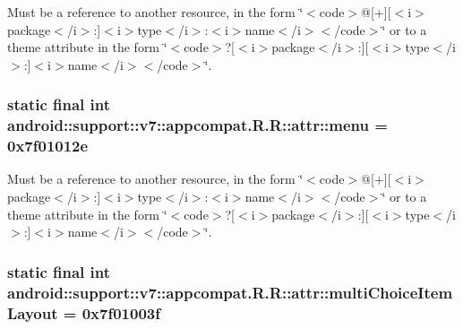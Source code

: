 Must be a reference to another resource, in the form \char`\"{}$<$code$>$@\mbox{[}+\mbox{]}\mbox{[}$<$i$>$package$<$/i$>$:\mbox{]}$<$i$>$type$<$/i$>$:$<$i$>$name$<$/i$>$$<$/code$>$\char`\"{} or to a theme attribute in the form \char`\"{}$<$code$>$?\mbox{[}$<$i$>$package$<$/i$>$:\mbox{]}\mbox{[}$<$i$>$type$<$/i$>$:\mbox{]}$<$i$>$name$<$/i$>$$<$/code$>$\char`\"{}. \hypertarget{classandroid_1_1support_1_1v7_1_1appcompat_1_1_r_1_1attr_8d30d60b10606828651e8c499f4fbe4e}{
\subsubsection[{menu}]{\setlength{\rightskip}{0pt plus 5cm}static final int android::support::v7::appcompat.R.R::attr::menu = 0x7f01012e}}
\label{classandroid_1_1support_1_1v7_1_1appcompat_1_1_r_1_1attr_8d30d60b10606828651e8c499f4fbe4e}


Must be a reference to another resource, in the form \char`\"{}$<$code$>$@\mbox{[}+\mbox{]}\mbox{[}$<$i$>$package$<$/i$>$:\mbox{]}$<$i$>$type$<$/i$>$:$<$i$>$name$<$/i$>$$<$/code$>$\char`\"{} or to a theme attribute in the form \char`\"{}$<$code$>$?\mbox{[}$<$i$>$package$<$/i$>$:\mbox{]}\mbox{[}$<$i$>$type$<$/i$>$:\mbox{]}$<$i$>$name$<$/i$>$$<$/code$>$\char`\"{}. \hypertarget{classandroid_1_1support_1_1v7_1_1appcompat_1_1_r_1_1attr_b3c13ecea5dbf95fc61058c63030d0b8}{
\subsubsection[{multiChoiceItemLayout}]{\setlength{\rightskip}{0pt plus 5cm}static final int android::support::v7::appcompat.R.R::attr::multiChoiceItemLayout = 0x7f01003f}}
\label{classandroid_1_1support_1_1v7_1_1appcompat_1_1_r_1_1attr_b3c13ecea5dbf95fc61058c63030d0b8}


